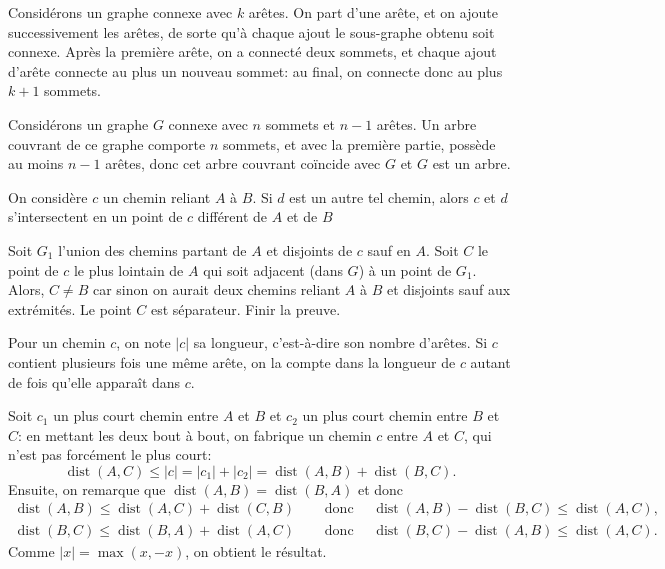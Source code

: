 \begin{Soln}{87}
Considérons un graphe connexe avec $k$ arêtes. On part d'une arête, et on ajoute successivement les arêtes, de sorte qu'à chaque ajout le sous-graphe obtenu soit connexe. Après la première arête, on a connecté deux sommets, et chaque ajout d'arête connecte au plus un nouveau sommet: au final, on connecte donc au plus $k+1$ sommets.

Considérons un graphe $G$ connexe avec $n$ sommets et $n-1$ arêtes. Un arbre couvrant de ce graphe comporte $n$ sommets, et avec la première partie, possède au moins $n-1$ arêtes, donc cet arbre couvrant coïncide avec $G$ et $G$ est un arbre.
\end{Soln}
\begin{Soln}{88}
On considère $c$ un chemin reliant $A$ à $B$. Si $d$ est un autre tel chemin, alors $c$ et $d$ s'intersectent en un point de $c$ différent de $A$ et de $B$

Soit $G_1$ l'union des chemins partant de $A$ et disjoints de $c$ sauf en $A$. Soit $C$ le point de $c$ le plus lointain de $A$ qui soit adjacent (dans $G$) à un point de $G_1$. Alors, $C\neq B$ car sinon on aurait deux chemins reliant $A$ à $B$ et disjoints sauf aux extrémités. Le point $C$ est séparateur. Finir la preuve.
\end{Soln}
\begin{Soln}{89}
Pour un chemin $c$, on note $|c|$ sa longueur, c'est-à-dire son nombre d'arêtes. Si $c$ contient plusieurs fois une même arête, on la compte dans la longueur de $c$ autant de fois qu'elle apparaît dans $c$.

Soit $c_1$ un plus court chemin entre $A$ et $B$ et $c_2$ un plus court chemin entre $B$ et $C$: en mettant les deux bout à bout, on fabrique un chemin $c$ entre $A$ et $C$, qui n'est pas forcément le plus court:
$$\operatorname{dist}(A,C) \le |c|=|c_1|+|c_2|=\operatorname{dist}(A,B)+\operatorname{dist}(B,C).$$
Ensuite, on remarque que $\operatorname{dist}(A,B)=\operatorname{dist}(B,A)$ et donc
\begin{align*}
\operatorname{dist}(A,B) \le \operatorname{dist}(A,C)+\operatorname{dist}(C,B) & \quad \text{ donc } \quad \operatorname{dist}(A,B)-\operatorname{dist}(B,C) \le \operatorname{dist}(A,C), \\
\operatorname{dist}(B,C) \le \operatorname{dist}(B,A)+\operatorname{dist}(A,C) &  \quad \text{ donc }  \quad \operatorname{dist}(B,C)-\operatorname{dist}(A,B) \le \operatorname{dist}(A,C).
\end{align*}
Comme $|x|=\max(x,-x)$, on obtient le résultat.
\end{Soln}
